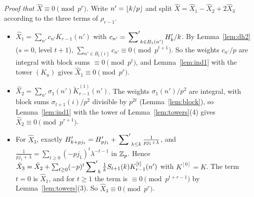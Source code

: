 \documentclass[11pt]{amsart}
\begin{document}
\emph{Proof that $\hat X\equiv0\pmod{p^r}$.} Write $n'=\left\lfloor k/p\right\rfloor$ and split $\hat X=\hat X_1-\hat X_2+2\hat X_3$ according to the three terms of $\rho_{r-1}$.
\begin{itemize}
\item $\hat X_1=\sum_{n'}c_{n'}K_{r-1}(n')$ with $c_{n'}=\sideset{}{'}\sum_{k\in B_1(n')}H'_k/k$. By Lemma~\ref{lem:dh2} ($s=0$, level $t+1$), $\sum_{n'\in B_t(i)}c_{n'}\equiv0\pmod{p^{t+1}}$. So the weights $c_{n'}/p$ are integral with block sums $\equiv0\pmod{p^t}$, and Lemma~\ref{lem:ind1} with the tower $(K_u)$ gives $\hat X_1\equiv0\pmod{p^r}$.
\item $\hat X_2=\sum_{n'}\sigma_1(n')\tilde K^{(1)}_{r-1}(n')$. The weights $\sigma_1(n')/p^2$ are integral, with block sums $\sigma_{t+1}(i)/p^2$ divisible by $p^{2t}$ (Lemma~\ref{lem:block}), so Lemma~\ref{lem:ind1} with the tower of Lemma~\ref{lem:towers}(4) gives $\hat X_2\equiv0\pmod{p^{r+1}}$.
\item For $\hat X_3$, exactly $H'_{k+pj_1}=H'_{pj_1}+\sideset{}{'}\sum_{\lambda\le k}\frac1{pj_1+\lambda}$, and $\frac1{pj_1+\lambda}=\sum_{t\ge0}(-pj_1)^t\lambda^{-t-1}$ in $\mathbb{Z}_{p}$. Hence $\hat X_3=\hat X_2+\sum_{t\ge0}(-p)^t\sideset{}{'}\sum_k\frac1kS_{t+1}(k)K^{[t]}_{r-1}(n')$ with $K^{[0]}=K$. The term $t=0$ is $\hat X_1$, and for $t\ge1$ the term is $\equiv0\pmod{p^{t+r-1}}$ by Lemma~\ref{lem:towers}(3). So $\hat X_3\equiv0\pmod{p^r}$.
\end{itemize}
\end{document}
